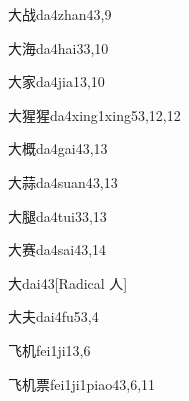 \begin{verbete}{大战}{da4zhan4}{3,9}
\end{verbete}

\begin{verbete}{大海}{da4hai3}{3,10}
\end{verbete}

\begin{verbete}{大家}{da4jia1}{3,10}
\end{verbete}

\begin{verbete}{大猩猩}{da4xing1xing5}{3,12,12}
\end{verbete}

\begin{verbete}{大概}{da4gai4}{3,13}
\end{verbete}

\begin{verbete}{大蒜}{da4suan4}{3,13}
\end{verbete}

\begin{verbete}{大腿}{da4tui3}{3,13}
\end{verbete}

\begin{verbete}{大赛}{da4sai4}{3,14}
\end{verbete}

\begin{verbete}{大}{dai4}{3}[Radical ⼈]
\end{verbete}

\begin{verbete}{大夫}{dai4fu5}{3,4}
\end{verbete}

\begin{verbete}{飞机}{fei1ji1}{3,6}
\end{verbete}

\begin{verbete}{飞机票}{fei1ji1piao4}{3,6,11}
\end{verbete}

